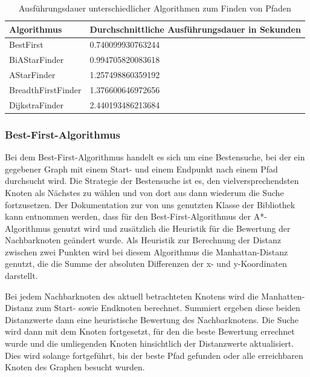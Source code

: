 \begin{table}[htb]
    \centering
    \begin{tabular}{|l|l|}
        \hline
            \textbf{Algorithmus} & {\textbf{Durchschnittliche Ausführungsdauer in Sekunden}} \\ \hline
            BestFirst 		    & 0.740099930763244 \\ \hline
            BiAStarFinder 		& 0.994705820083618 \\ \hline
            AStarFinder 		& 1.257498860359192 \\ \hline
            BreadthFirstFinder  & 1.376600646972656 \\ \hline
            DijkstraFinder		& 2.440193486213684 \\ \hline
    \end{tabular}
    \caption{Ausführungsdauer unterschiedlicher Algorithmen zum Finden von Pfaden}
    \label{tab:ausfuehrungsdauer-pfadalgorithmen}
\end{table}

\subsubsection*{Best-First-Algorithmus}
\label{subsubsec:best-first-algorithm}

Bei dem Best-First-Algorithmus handelt es sich um eine Bestensuche, bei der ein gegebener Graph mit einem Start- und
einem Endpunkt nach einem Pfad durchsucht wird.
Die Strategie der Bestensuche ist es, den vielversprechendsten Knoten als Nächstes zu wählen und von dort aus dann
wiederum die Suche fortzusetzen.
Der Dokumentation zur von uns genutzten Klasse  der Bibliothek  kann entnommen werden,
dass für den Best-First-Algorithmus der A*-Algorithmus genutzt wird und zusätzlich die Heuristik für die Bewertung der
Nachbarknoten geändert wurde.
Als Heuristik zur Berechnung der Distanz zwischen zwei Punkten wird bei diesem Algorithmus die Manhattan-Distanz
genutzt, die die Summe der absoluten Differenzen der x- und y-Koordinaten darstellt. 

Bei jedem Nachbarknoten des aktuell betrachteten Knotens wird die Manhatten-Distanz zum Start- sowie Endknoten
berechnet.
Summiert ergeben diese beiden Distanzwerte dann eine heuristische Bewertung des Nachbarknotens.
Die Suche wird dann mit dem Knoten fortgesetzt, für den die beste Bewertung errechnet wurde und die umliegenden Knoten
hinsichtlich der Distanzwerte aktualisiert.
Dies wird solange fortgeführt, bis der beste Pfad gefunden oder alle erreichbaren Knoten des Graphen besucht wurden.

